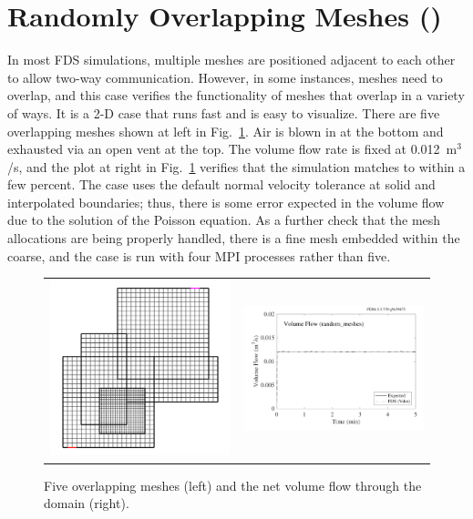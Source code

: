 \documentclass[11pt]{book}
\begin{document}
\section{Randomly Overlapping Meshes (\texorpdfstring{}{random\_meshes})}
\label{random_meshes}

In most FDS simulations, multiple meshes are positioned adjacent to each other to allow two-way communication. However, in some instances, meshes need to overlap, and this case verifies the functionality of meshes that overlap in a variety of ways. It is a 2-D case that runs fast and is easy to visualize. There are five overlapping meshes shown at left in Fig.~\ref{random_meshes_fig}. Air is blown in at the bottom and exhausted via an open vent at the top. The volume flow rate is fixed at 0.012~m$^3$/s, and the plot at right in Fig.~\ref{random_meshes_fig} verifies that the simulation matches to within a few percent. The case uses the default normal velocity tolerance at solid and interpolated boundaries; thus, there is some error expected in the volume flow due to the solution of the Poisson equation. As a further check that the mesh allocations are being properly handled, there is a fine mesh embedded within the coarse, and the case is run with four MPI processes rather than five.

\begin{figure}[!ht]
\begin{tabular*}{\textwidth}{lr}
\includegraphics[width=3.2in]{SCRIPT_FIGURES/random_meshes.png} &
\includegraphics[width=3.2in]{SCRIPT_FIGURES/random_meshes.pdf}
\end{tabular*}
\caption[The  test case]{Five overlapping meshes (left) and the net volume flow through the domain (right).}
\label{random_meshes_fig}
\end{figure}
\end{document}
